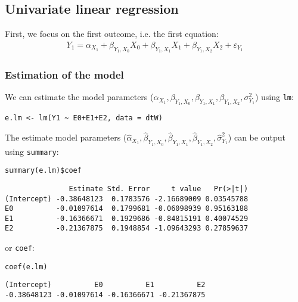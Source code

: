 \documentclass{article}
\begin{document}
\subsection{Univariate linear regression}
\label{sec:org9d2bcb6}

First, we focus on the first outcome, i.e. the first equation:
\begin{align*}
Y_{1} = \alpha_{X_{1}} + \beta_{Y_1,X_0} X_{0} + \beta_{Y_1,X_1} X_{1} + \beta_{Y_1,X_2} X_{2} + \varepsilon_{Y_1} 
\end{align*}


\subsubsection{Estimation of the model}
\label{sec:org85a3e13}

We can estimate the model parameters
(\(\alpha_{X_{1}},\beta_{Y_1,X_0},\beta_{Y_1,X_1},\beta_{Y_1,X_2},\sigma^2_{Y_1}\))
using \texttt{lm}:
\lstset{language=r,label= ,caption= ,captionpos=b,numbers=none}
\begin{lstlisting}
e.lm <- lm(Y1 ~ E0+E1+E2, data = dtW)
\end{lstlisting}

The estimate model parameters
(\(\hat{\alpha}_{X_{1}},\hat{\beta}_{Y_1,X_0},\hat{\beta}_{Y_1,X_1},\hat{\beta}_{Y_1,X_2},\hat{\sigma}^2_{Y_1}\))
can be output using \texttt{summary}:
\lstset{language=r,label= ,caption= ,captionpos=b,numbers=none}
\begin{lstlisting}
summary(e.lm)$coef
\end{lstlisting}

\begin{verbatim}
               Estimate Std. Error     t value   Pr(>|t|)
(Intercept) -0.38648123  0.1783576 -2.16689009 0.03545788
E0          -0.01097614  0.1799681 -0.06098939 0.95163188
E1          -0.16366671  0.1929686 -0.84815191 0.40074529
E2          -0.21367875  0.1948854 -1.09643293 0.27859637
\end{verbatim}

or \texttt{coef}:
\lstset{language=r,label= ,caption= ,captionpos=b,numbers=none}
\begin{lstlisting}
coef(e.lm)
\end{lstlisting}

\begin{verbatim}
(Intercept)          E0          E1          E2 
-0.38648123 -0.01097614 -0.16366671 -0.21367875
\end{verbatim}
\end{document}
